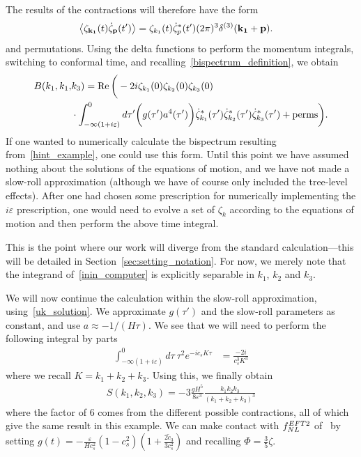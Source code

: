 The results of the contractions will therefore have the form
\begin{align}
    \left<\zeta_{\mathbf{k_1}}(t)\dot{\zeta}_{\mathbf{p}}(t')\right>
    &= \zeta_{k_1}(t)\dot{\zeta}^*_{p}(t')(2\pi)^3\delta^{(3)}(\mathbf{k_1}+\mathbf{p}).
\end{align}
and permutations.
Using the delta functions to perform the momentum integrals,
switching to conformal time,
and recalling~\eqref{bispectrum_definition}, we obtain
\begin{align}\label{inin_computer}
    B(k_1, k_1,&k_3)
    =
    \operatorname{Re}\bigg(-2i \zeta_{k_1}(0)\zeta_{k_2}(0)\zeta_{k_3}(0)\nonumber\\
    &\cdot\int_{-\infty(1+i\varepsilon)}^{0}d\tau'\bigg(g(\tau') a^4(\tau')\bigg)
    \dot{\zeta}^*_{k_1}(\tau')
    \dot{\zeta}^*_{k_2}(\tau')
    \dot{\zeta}^*_{k_3}(\tau')
    +\text{perms}
    \bigg).
\end{align}
If one wanted to numerically calculate the bispectrum resulting from~\eqref{hint_example},
one could use this form. Until this point we have assumed nothing about the solutions of the
equations of motion, and we have not made a slow-roll approximation (although we have
of course only included the tree-level effects).
After one had chosen some prescription for numerically implementing the
$i\varepsilon$ prescription, one would need to evolve a set of $\zeta_{k}$
according to the equations of motion and then perform the above time integral.


This is the point where our work will diverge from the standard calculation---this
will be detailed in Section~\ref{sec:setting_notation}. For now, we merely note that
the integrand of~\eqref{inin_computer} is explicitly separable in $k_1$, $k_2$ and $k_3$.


We will now continue the calculation within the slow-roll approximation,
using~\eqref{uk_solution}. We approximate $g(\tau')$ and the slow-roll
parameters as constant, and use $a\approx-1/(H\tau)$.
We see that we will need to perform the following integral by parts
\begin{align}
    \int_{-\infty(1+i\varepsilon)}^{0}d\tau~\tau^2 e^{-ic_sK\tau}
    &= \frac{-2i}{c_s^3K^3}
\end{align}
where we recall $K=k_1+k_2+k_3$.
Using this, we finally obtain
\begin{align}
    S(k_1, k_2, k_3) = -3\frac{g H^5}{8\varepsilon^3}\frac{k_1k_2k_3}{(k_1+k_2+k_3)^3}
\end{align}
where the factor of $6$ comes from the different possible contractions, all
of which give the same result in this example.
We can make contact with $f_{NL}^{EFT2}$ of~\cite{Planck_NG_2018, Senatore_wmap_2009}
by setting $g(t)=-\frac{\varepsilon}{Hc_s^2}(1-c_s^2)\left(1+\frac{2\tilde{c}_3}{3c_s^2}\right)$
and recalling $\Phi=\frac{3}{5}\zeta$.


